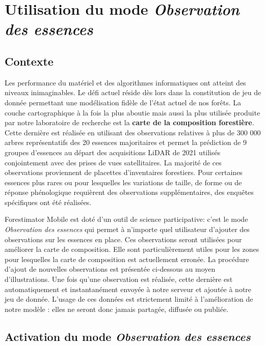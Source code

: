 \documentclass[12pt,a4paper]{report}
\begin{document}
\section{Utilisation du mode \textit{Observation des essences}}

\subsection{Contexte}

Les performance du matériel et des algorithmes informatiques ont atteint des niveaux inimaginables. Le défi actuel réside dès lors dans la constitution de jeu de donnée permettant une modélisation fidèle de l'état actuel de nos forêts. La couche cartographique à la fois la plus aboutie mais aussi la plus utilisée produite par notre laboratoire de recherche est la \textbf{carte de la composition forestière}. Cette dernière est réalisée en utilisant des observations relatives à plus de 300 000 arbres représentatifs des 20 essences majoritaires et permet la prédiction de 9 groupes d'essences au départ des acquisitions LiDAR de 2021 utilisés conjointement avec des prises de vues satellitaires. La majorité de ces observations proviennent de placettes d'inventaires forestiers. Pour certaines essences plus rares ou pour lesquelles les variations de taille, de forme ou de réponse phénologique requièrent des observations supplémentaires, des enquêtes spécifiques ont été réalisées.

Forestimator Mobile est doté d'un outil de science participative: c'est le mode \textit{Observation des essences} qui permet à n'importe quel utilisateur d'ajouter des observations sur les essences en place. Ces observations seront utilisées pour améliorer la carte de composition. Elle sont particulièrement utiles pour les zones pour lesquelles la carte de composition est actuellement erronée. La procédure d'ajout de nouvelles observations est présentée ci-dessous au moyen d'illustrations. Une fois qu'une observation est réalisée, cette dernière est automatiquement et instantanément envoyée à notre serveur et ajoutée à notre jeu de donnée. L'usage de ces données est strictement limité à l'amélioration de notre modèle : elles ne seront donc jamais partagée, diffusée ou publiée.
 
\subsection{Activation du mode \textit{Observation des essences}}
\end{document}
